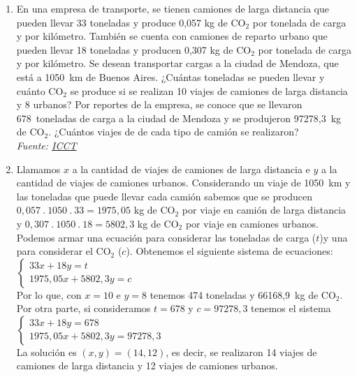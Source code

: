 \documentclass[a4paper]{article}
\newcommand{\answer}{\item[**]}
\begin{document}
\begin{enumerate}
\begin{enumerate} [label=(\alph*)]
		\item En una empresa de transporte, se tienen camiones de larga distancia que pueden llevar 33 toneladas y produce 0,057 kg de CO$_2$ por tonelada de carga y por kilómetro. También se cuenta con camiones de reparto urbano que pueden llevar 18 toneladas y producen 0,307 kg de CO$_2$ por tonelada de carga y por kilómetro. Se desean transportar cargas a la ciudad de Mendoza, que está a 1050~km de Buenos Aires. ¿Cuántas toneladas se pueden llevar y cuánto CO$_2$ se produce si se realizan 10 viajes de camiones de larga distancia y 8 urbanos? Por reportes de la empresa, se conoce que se llevaron 678~toneladas de carga a la ciudad de Mendoza y se produjeron 97278,3~kg de CO$_2$. ¿Cuántos viajes de de cada tipo de camión se realizaron? \\ \textit{Fuente: \href{https://theicct.org/publication/co2-emissions-from-trucks-in-the-eu-an-analysis-of-the-heavy-duty-co2-standards-baseline-data/}{ICCT}}
		\answer Llamamos $x$ a la cantidad de viajes de camiones de larga distancia e $y$ a la cantidad de viajes de camiones urbanos. Considerando un viaje de 1050~km y las toneladas que puede llevar cada camión sabemos que se producen $0,057~.~1050~.~33=1975,05$ kg de CO$_2$ por viaje en camión de larga distancia y $0,307~.~1050~.~18=5802,3$ kg de CO$_2$ por viaje en camiones urbanos. Podemos armar una ecuación para considerar las toneladas de carga ($t$)y una para considerar el CO$_2$ ($c$). Obtenemos el siguiente sistema de ecuaciones: \\ \vspace{2mm} $\left\{\begin{matrix} 33x+18y=t \\ 1975,05x+5802,3y=c \end{matrix}\right.$ \\ Por lo que, con $x=10$ e $y=8$ tenemos 474 toneladas y 66168,9~kg de CO$_2$. Por otra parte, si consideramos $t=678$ y $c=97278,3$ tenemos el sistema \\ \vspace{2mm} $\left\{\begin{matrix} 33x+18y=678 \\ 1975,05x+5802,3y=97278,3 \end{matrix}\right.$ \\ La solución es $(x,y)=(14,12)$, es decir, se realizaron 14 viajes de camiones de larga distancia y 12 viajes de camiones urbanos.


\end{enumerate}
\end{enumerate}
\end{document}
